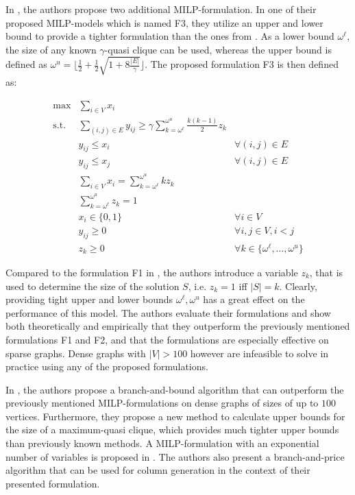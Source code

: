 \documentclass[draft,final]{vutinfth} %
\begin{document}
In \cite{VeremyevPBP16}, the authors propose two additional MILP-formulation. 
In one of their proposed MILP-models which is named F3, they utilize an upper and lower bound to provide a tighter formulation than the ones from \cite{pattillo_maximum_2013}. As a lower bound $\omega^{\ell}$, the size of any known $\gamma$-quasi clique can be used, whereas the upper bound is defined as  $\omega^u = \lfloor \frac{1}{2} + \frac{1}{2} \sqrt{1 + 8\frac{|E|}{\gamma}} \rfloor$. The proposed formulation F3 is then defined as: 

\begin{align}
    \max & \sum_{i \in V} x_i \\
    \text{s.t.} & \sum_{(i,j) \in E} y_{ij} \geq \gamma \sum_{k = \omega^{\ell}}^{\omega^u} \frac{k(k-1)}{2} z_k \\
    & y_{ij} \leq x_i & \forall(i,j) \in E \\
    & y_{ij} \leq x_j & \forall(i,j) \in E \\
    & \sum_{i \in V} x_i = \sum_{k = \omega^{\ell}}^{\omega^u} k z_k & \\
    & \sum_{k = \omega^{\ell}}^{\omega^u} z_k = 1 \\
    & x_i \in \{0,1\} & \forall i \in V \\
    & y_{ij} \geq 0 & \forall i, j \in V, i < j\\
    & z_k \geq 0 & \forall k \in \{\omega^{\ell}, \dots, \omega^u\}
\end{align}

Compared to the formulation F1 in \cite{pattillo_maximum_2013}, the authors introduce a variable $z_k$, that is used to determine the size of the solution $S$, i.e. $z_k = 1$ iff $|S| = k$. Clearly, providing tight upper and lower bounds $\omega^{\ell}, \omega^u$ has a great effect on the performance of this model. The authors evaluate their formulations and show both theoretically and empirically that they outperform the previously mentioned formulations F1 and F2, and that the formulations are especially effective on sparse graphs. Dense graphs with $|V| > 100$ however are infeasible to solve in practice using any of the proposed formulations. 

In \cite{ribeiro_exact_2019}, the authors propose a branch-and-bound algorithm that can outperform the previously mentioned MILP-formulations on dense graphs of sizes of up to $100$ vertices. Furthermore, they propose a new method to calculate upper bounds for the size of a maximum-quasi clique, which provides much tighter upper bounds than previously known methods. A MILP-formulation with an exponential number of variables is proposed in \cite{marinelli_lp-based_2021}. The authors also present a branch-and-price algorithm that can be used for column generation in the context of their presented formulation. 
\end{document}
